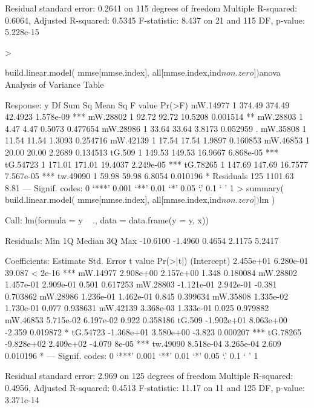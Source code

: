 Residual standard error: 0.2641 on 115 degrees of freedom
Multiple R-squared:  0.6064,	Adjusted R-squared:  0.5345 
F-statistic: 8.437 on 21 and 115 DF,  p-value: 5.228e-15

> 



  build.linear.model( mmse[mmse.index], all[mmse.index,ind$non.zero])$anova 
Analysis of Variance Table

Response: y
           Df  Sum Sq Mean Sq F value    Pr(>F)    
mW.14977    1  374.49  374.49 42.4923 1.578e-09 ***
mW.28802    1   92.72   92.72 10.5208  0.001514 ** 
mW.28803    1    4.47    4.47  0.5073  0.477654    
mW.28986    1   33.64   33.64  3.8173  0.052959 .  
mW.35808    1   11.54   11.54  1.3093  0.254716    
mW.42139    1   17.54   17.54  1.9897  0.160853    
mW.46853    1   20.00   20.00  2.2689  0.134513    
tG.509      1  149.53  149.53 16.9667 6.868e-05 ***
tG.54723    1  171.01  171.01 19.4037 2.249e-05 ***
tG.78265    1  147.69  147.69 16.7577 7.567e-05 ***
tw.49090    1   59.98   59.98  6.8054  0.010196 *  
Residuals 125 1101.63    8.81                      
---
Signif. codes:  0 ‘***’ 0.001 ‘**’ 0.01 ‘*’ 0.05 ‘.’ 0.1 ‘ ’ 1
> summary(  build.linear.model( mmse[mmse.index], all[mmse.index,ind$non.zero])$lm )

Call:
lm(formula = y ~ ., data = data.frame(y = y, x))

Residuals:
     Min       1Q   Median       3Q      Max 
-10.6100  -1.4960   0.4654   2.1175   5.2417 

Coefficients:
              Estimate Std. Error t value Pr(>|t|)    
(Intercept)  2.455e+01  6.280e-01  39.087  < 2e-16 ***
mW.14977     2.908e+00  2.157e+00   1.348 0.180084    
mW.28802     1.457e-01  2.909e-01   0.501 0.617253    
mW.28803    -1.121e-01  2.942e-01  -0.381 0.703862    
mW.28986     1.236e-01  1.462e-01   0.845 0.399634    
mW.35808     1.335e-02  1.730e-01   0.077 0.938631    
mW.42139     3.368e-03  1.333e-01   0.025 0.979882    
mW.46853     5.715e-02  6.197e-02   0.922 0.358186    
tG.509      -1.902e+01  8.063e+00  -2.359 0.019872 *  
tG.54723    -1.368e+01  3.580e+00  -3.823 0.000207 ***
tG.78265    -9.828e+02  2.409e+02  -4.079    8e-05 ***
tw.49090     8.518e-04  3.265e-04   2.609 0.010196 *  
---
Signif. codes:  0 ‘***’ 0.001 ‘**’ 0.01 ‘*’ 0.05 ‘.’ 0.1 ‘ ’ 1

Residual standard error: 2.969 on 125 degrees of freedom
Multiple R-squared:  0.4956,	Adjusted R-squared:  0.4513 
F-statistic: 11.17 on 11 and 125 DF,  p-value: 3.371e-14


